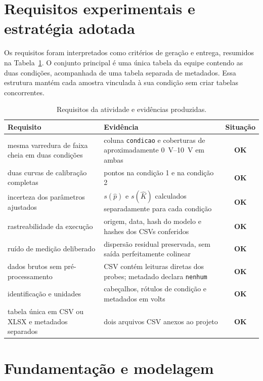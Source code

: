 \documentclass[12pt,a4paper]{article}
\newcommand{\checkok}{\textcolor{verde}{\textbf{OK}}}
\begin{document}
\section{Requisitos experimentais e estratégia adotada}

Os requisitos foram interpretados como critérios de geração e entrega, resumidos na Tabela~\ref{tab:requisitos}. O conjunto principal é uma única tabela da equipe contendo as duas condições, acompanhada de uma tabela separada de metadados. Essa estrutura mantém cada amostra vinculada à sua condição sem criar tabelas concorrentes.

\begin{table}[H]
  \centering
  \caption{Requisitos da atividade e evidências produzidas.}
  \label{tab:requisitos}
  \small
  \begin{tabularx}{\textwidth}{>{\raggedright\arraybackslash}p{} X c}
    \toprule
    Requisito & Evidência & Situação \\
    \midrule
    mesma varredura de faixa cheia em duas condições & coluna \texttt{condicao} e coberturas de aproximadamente \SIrange{0}{10}{\volt} em ambas & \checkok \\
    duas curvas de calibração completas & \AmostrasUm{} pontos na condição 1 e \AmostrasDois{} na condição 2 & \checkok \\
    incerteza dos parâmetros ajustados & $s(\widehat p)$ e $s(\widehat K)$ calculados separadamente para cada condição & \checkok \\
    rastreabilidade da execução & origem, data, hash do modelo e hashes dos CSVs conferidos & \checkok \\
    ruído de medição deliberado & dispersão residual preservada, sem saída perfeitamente colinear & \checkok \\
    dados brutos sem pré-processamento & CSV contém leituras diretas dos probes; metadado declara \texttt{nenhum} & \checkok \\
    identificação e unidades & cabeçalhos, rótulos de condição e metadados em volts & \checkok \\
    tabela única em CSV ou XLSX e metadados separados & dois arquivos CSV anexos ao projeto & \checkok \\
    \bottomrule
  \end{tabularx}
\end{table}

\section{Fundamentação e modelagem}
\end{document}
